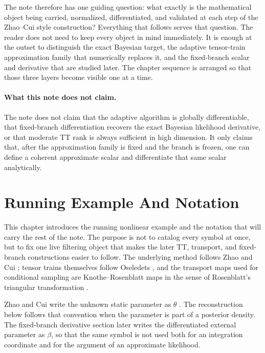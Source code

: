 \documentclass[11pt]{article}
\numberwithin{equation}{section}
\begin{document}
The note therefore has one guiding question: what exactly is the mathematical
object being carried, normalized, differentiated, and validated at each step of
the Zhao--Cui style construction?  Everything that follows serves that question.
The reader does not need to keep every object in mind immediately.  It is enough
at the outset to distinguish the exact Bayesian target, the adaptive tensor-train
approximation family that numerically replaces it, and the fixed-branch scalar
and derivative that are studied later.  The chapter sequence is arranged so that
those three layers become visible one at a time.

\paragraph{What this note does not claim.}
The note does not claim that the adaptive algorithm is globally differentiable,
that fixed-branch differentiation recovers the exact Bayesian likelihood
derivative, or that moderate TT rank is always sufficient in high dimension.  It
only claims that, after the approximation family is fixed and the branch is
frozen, one can define a coherent approximate scalar and differentiate that same
scalar analytically.

\tableofcontents
\section{Running Example And Notation}

This chapter introduces the running nonlinear example and the notation that will
carry the rest of the note.  The purpose is not to catalog every symbol at once,
but to fix one live filtering object that makes the later TT, transport, and
fixed-branch constructions easier to follow.  The underlying method follows Zhao
and Cui \cite{zhao2024ttsequential}; tensor trains themselves follow Oseledets
\cite{oseledets2011tt}, and the transport maps used for conditional sampling are
Knothe--Rosenblatt maps in the sense of Rosenblatt's triangular transformation
\cite{rosenblatt1952remarks}.

Zhao and Cui write the unknown static parameter as \(\theta\)
\cite{zhao2024ttsequential}.  The reconstruction below follows that convention
when the parameter is part of a posterior density.  The fixed-branch derivative
section later writes the differentiated external parameter as \(\beta\), so
that the same symbol is not used both for an integration coordinate and for the
argument of an approximate likelihood.
\end{document}
